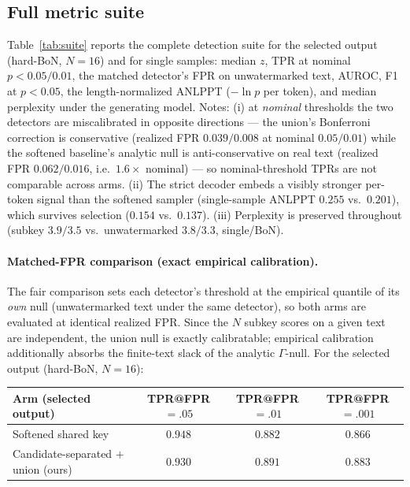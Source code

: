 \documentclass{article} %
\begin{document}
\subsection{Full metric suite}
Table~\ref{tab:suite} reports the complete detection suite for the selected
output (hard-BoN, $N{=}16$) and for single samples: median $z$, TPR at nominal
$p<0.05/0.01$, the matched detector's FPR on unwatermarked text, AUROC, F1 at
$p<0.05$, the length-normalized ANLPPT ($-\ln p$ per token), and median
perplexity under the generating model. Notes: (i) at \emph{nominal} thresholds
the two detectors are miscalibrated in opposite directions --- the union's
Bonferroni correction is conservative (realized FPR $0.039/0.008$ at nominal
$0.05/0.01$) while the softened baseline's analytic null is anti-conservative
on real text (realized FPR $0.062/0.016$, i.e.\ $1.6\times$ nominal) --- so
nominal-threshold TPRs are not comparable across arms.
(ii) The strict decoder embeds a visibly stronger per-token signal than the
softened sampler (single-sample ANLPPT $0.255$ vs.\ $0.201$), which survives
selection ($0.154$ vs.\ $0.137$). (iii) Perplexity is preserved throughout
(subkey $3.9/3.5$ vs.\ unwatermarked $3.8/3.3$, single/BoN).

\paragraph{Matched-FPR comparison (exact empirical calibration).}
The fair comparison sets each detector's threshold at the empirical quantile of
its \emph{own} null (unwatermarked text under the same detector), so both arms
are evaluated at identical realized FPR. Since the $N$ subkey scores on a given
text are independent, the union null is exactly calibratable; empirical
calibration additionally absorbs the finite-text slack of the analytic
$\Gamma$-null. For the selected output (hard-BoN, $N{=}16$):

\begin{center}
\small
\begin{tabular}{lccc}
\toprule
Arm (selected output) & TPR@FPR$=.05$ & TPR@FPR$=.01$ & TPR@FPR$=.001$ \\
\midrule
Softened shared key & $\mathbf{0.948}$ & $0.882$ & $0.866$ \\
Candidate-separated $+$ union (ours) & $0.930$ & $\mathbf{0.891}$ & $\mathbf{0.883}$ \\
\bottomrule
\end{tabular}
\end{center}
\end{document}
